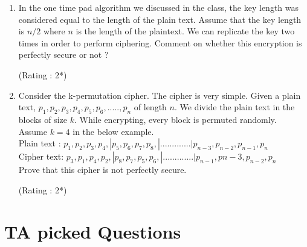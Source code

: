 \documentclass[paper=a4, fontsize=11pt]{scrartcl} %
\numberwithin{equation}{section} %
\numberwithin{figure}{section} %
\numberwithin{table}{section} %
\begin{document}
\begin{enumerate}
\item In the one time pad algorithm we discussed in the class, the key length was considered equal to the length of the plain text. Assume that the key length is $n/2$ where $n$ is the length of the plaintext. We can replicate the key two times in order to perform ciphering. Comment on whether this encryption is perfectly secure or not ? 
\begin{flushright}
\small{(Rating : 2*)}
\end{flushright}
\vspace{0.2cm}

\item Consider the k-permutation cipher. The cipher is very simple. Given a plain text, $p_1, p_2, p_3, p_4, p_5, p_6, ....., p_n$ of length $n$. We divide the plain text in the blocks of size $k$. While encrypting, every block is permuted randomly. \\

Assume $k=4$ in the below example.\\

Plain text : $p_1, p_2, p_3, p_4, | p_5, p_6, p_7, p_8, | .............| p_{n-3}, p_{n-2}, p_{n-1}, p_{n}$\\

Cipher text: $p_3, p_1, p_4, p_2, | p_8, p_7, p_5, p_6, | .............| p_{n-1}, p{n-3}, p_{n-2}, p_{n}$\\

Prove that this cipher is not perfectly secure. 
\begin{flushright}
\small{(Rating : 2*)}
\end{flushright}
\vspace{0.2cm}
\end{enumerate}

\section{TA picked Questions}
\end{document}
